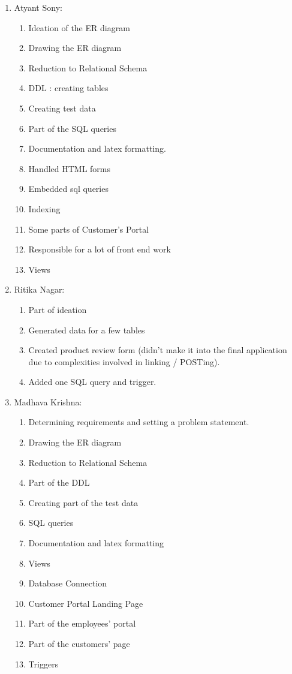 \documentclass[12pt]{report}
\begin{document}
\begin{enumerate}
		\item Atyant Sony:
			\begin{enumerate}
				\item Ideation of the ER diagram
				\item Drawing the ER diagram
				\item Reduction to Relational Schema
				\item DDL : creating tables
				\item Creating test data
				\item Part of the SQL queries
				\item Documentation and latex formatting.
				\item Handled HTML forms
                \item Embedded sql queries
                \item Indexing
                \item Some parts of Customer's Portal
                \item Responsible for a lot of front end work
                \item Views
			\end{enumerate}
		\item Ritika Nagar:			
            \begin{enumerate}
                \item Part of ideation
                \item Generated data for a few tables
                \item Created product review form (didn't make it into the final application due to complexities involved in linking / POSTing).
                \item Added one SQL query and trigger.
            \end{enumerate}
		\item Madhava Krishna:
			\begin{enumerate}
				\item Determining requirements and setting a problem statement.
				\item Drawing the ER diagram
				\item Reduction to Relational Schema
				\item Part of the DDL
				\item Creating part of the test data
				\item SQL queries
				\item Documentation and latex formatting
				\item Views
				\item Database Connection
				\item Customer Portal Landing Page
				\item Part of the employees' portal
				\item Part of the customers' page
                \item Triggers
			\end{enumerate}
	\end{enumerate}
\end{document}
